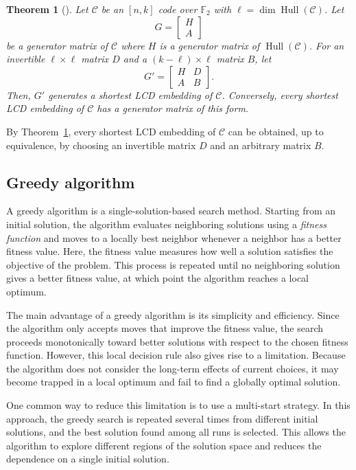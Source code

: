 \documentclass{article}
\newtheorem{theorem}{Theorem}[section]
\theoremstyle{definition}
\theoremstyle{remark}
\begin{document}
\begin{theorem}[\cite{AHKL-2026}]\label{shortest-lcd-embedding}
    Let $\mathcal{C}$ be an $[n,k]$ code over $\mathbb{F}_2$ with $\ell=\dim\operatorname{Hull}(\mathcal{C})$. Let
    \[
    G = \begin{bmatrix}
        H \\ A
    \end{bmatrix}
    \]
    be a generator matrix of $\mathcal{C}$ where $H$ is a generator matrix of $\operatorname{Hull}(\mathcal{C})$. For an invertible $\ell\times\ell$ matrix $D$ and a $(k-\ell)\times\ell$ matrix $B$, let \[
    G' = \begin{bmatrix}
        H & D \\ A & B
    \end{bmatrix}.
    \]
    Then, $G'$ generates a shortest LCD embedding of $\mathcal{C}$. Conversely, every shortest LCD embedding of $\mathcal{C}$ has a generator matrix of this form.
\end{theorem}
By Theorem~\ref{shortest-lcd-embedding}, every shortest LCD embedding of $\mathcal{C}$ can be obtained, up to equivalence, by choosing an invertible matrix $D$ and an arbitrary matrix $B$.

\subsection{Greedy algorithm}

A greedy algorithm is a single-solution-based search method. Starting from an initial solution, the algorithm evaluates neighboring solutions using a \textit{fitness function} and moves to a locally best neighbor whenever a neighbor has a better fitness value. Here, the fitness value measures how well a solution satisfies the objective of the problem. This process is repeated until no neighboring solution gives a better fitness value, at which point the algorithm reaches a local optimum.

The main advantage of a greedy algorithm is its simplicity and efficiency. Since the algorithm only accepts moves that improve the fitness value, the search proceeds monotonically toward better solutions with respect to the chosen fitness function. However, this local decision rule also gives rise to a limitation. Because the algorithm does not consider the long-term effects of current choices, it may become trapped in a local optimum and fail to find a globally optimal solution.

One common way to reduce this limitation is to use a multi-start strategy. In this approach, the greedy search is repeated several times from different initial solutions, and the best solution found among all runs is selected. This allows the algorithm to explore different regions of the solution space and reduces the dependence on a single initial solution.
\end{document}
